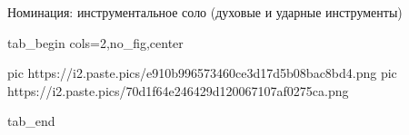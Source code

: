  
 
 
 
 

Номинация: инструментальное соло (духовые и ударные инструменты) 

\ifcmt
  tab_begin cols=2,no_fig,center

     pic https://i2.paste.pics/e910b996573460ce3d17d5b08bac8bd4.png
		 pic https://i2.paste.pics/70d1f64e246429d120067107af0275ca.png

  tab_end
\fi
